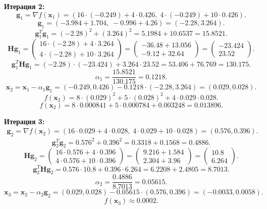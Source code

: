 \documentclass[a4paper,14pt,oneside,openany]{memoir}
\begin{document}
\textbf{Итерация 2:}
\[
\mathbf{g}_1 = \nabla f(\mathbf{x}_1) = (16 \cdot (-0.249) + 4 \cdot 0.426, \; 4 \cdot (-0.249) + 10 \cdot 0.426).
\]
\[
\mathbf{g}_1 = (-3.984 + 1.704, \; -0.996 + 4.26) = (-2.28, 3.264).
\]
\[
\mathbf{g}_1^T \mathbf{g}_1 = (-2.28)^2 + (3.264)^2 = 5.1984 + 10.6537 = 15.8521.
\]
\[
\mathbf{H} \mathbf{g}_1 = \begin{pmatrix} 16 \cdot (-2.28) + 4 \cdot 3.264 \\ 4 \cdot (-2.28) + 10 \cdot 3.264 \end{pmatrix} = \begin{pmatrix} -36.48 + 13.056 \\ -9.12 + 32.64 \end{pmatrix} = \begin{pmatrix} -23.424 \\ 23.52 \end{pmatrix}.
\]
\[
\mathbf{g}_1^T \mathbf{H} \mathbf{g}_1 = (-2.28) \cdot (-23.424) + 3.264 \cdot 23.52 = 53.406 + 76.769 = 130.175.
\]
\[
\alpha_1 = \frac{15.8521}{130.175} = 0.1218.
\]
\[
\mathbf{x}_2 = \mathbf{x}_1 - \alpha_1 \mathbf{g}_1 = (-0.249, 0.426) - 0.1218 \cdot (-2.28, 3.264) = (0.029, 0.028).
\]
\[
f(\mathbf{x}_2) = 8 \cdot (0.029)^2 + 5 \cdot (0.028)^2 + 4 \cdot 0.029 \cdot 0.028.
\]
\[
f(\mathbf{x}_2) = 8 \cdot 0.000841 + 5 \cdot 0.000784 + 0.003248  = 0.013896.
\]

\textbf{Итерация 3:}
\[
\begin{aligned}
\mathbf{g}_2 = \nabla f(\mathbf{x}_2) = (16 \cdot 0.029 + 4 \cdot 0.028, \; 4 \cdot 0.029 + 10 \cdot 0.028)  = (0.576, 0.396).
\end{aligned}
\]
\[
\mathbf{g}_2^T \mathbf{g}_2 = 0.576^2 + 0.396^2 = 0.3318 + 0.1568 = 0.4886.
\]
\[
\mathbf{H} \mathbf{g}_2 = \begin{pmatrix} 16 \cdot 0.576 + 4 \cdot 0.396 \\ 4 \cdot 0.576 + 10 \cdot 0.396 \end{pmatrix} = \begin{pmatrix} 9.216 + 1.584 \\ 2.304 + 3.96 \end{pmatrix} = \begin{pmatrix} 10.8 \\ 6.264 \end{pmatrix}.
\]
\[
\mathbf{g}_2^T \mathbf{H} \mathbf{g}_2 = 0.576 \cdot 10.8 + 0.396 \cdot 6.264 = 6.2208 + 2.4805 = 8.7013.
\]
\[
\alpha_2 = \frac{0.4886}{8.7013} = 0.05615.
\]
\[
\mathbf{x}_3 = \mathbf{x}_2 - \alpha_2 \mathbf{g}_2 = (0.029, 0.028) - 0.05615 \cdot (0.576, 0.396) = (-0.0033, 0.0058).
\]
\[
f(\mathbf{x}_3) \approx 0.0002.
\]
\end{document}
